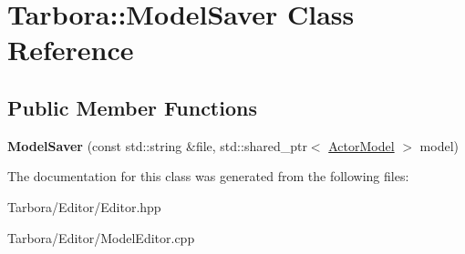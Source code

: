\hypertarget{classTarbora_1_1ModelSaver}{}\section{Tarbora\+:\+:Model\+Saver Class Reference}
\label{classTarbora_1_1ModelSaver}
\subsection*{Public Member Functions}
\begin{DoxyCompactItemize}
\item 
\mbox{\label{classTarbora_1_1ModelSaver_a112b8149e1bf569a62f4c7fbd74c283d}} 
{\bfseries Model\+Saver} (const std\+::string \&file, std\+::shared\+\_\+ptr$<$ \hyperlink{classTarbora_1_1ActorModel}{Actor\+Model} $>$ model)
\end{DoxyCompactItemize}


The documentation for this class was generated from the following files\+:\begin{DoxyCompactItemize}
\item 
Tarbora/\+Editor/Editor.\+hpp\item 
Tarbora/\+Editor/Model\+Editor.\+cpp\end{DoxyCompactItemize}
